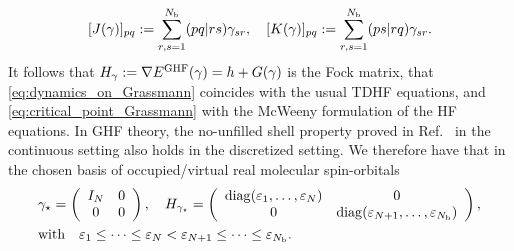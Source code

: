 \documentclass[11pt]{article}
\begin{document}
\begin{equation}
    \label{eqn:HF Coulomb exchange term}
    [J(\gamma)]_{pq}:=\sum_{r,s=1}^{N_{\rm b}}(pq|rs)\gamma_{sr},\quad [K(\gamma)]_{pq}:=\sum_{r,s=1}^{N_{\rm b}}(ps|rq)\gamma_{sr}.
\end{equation}
It follows that $H_\gamma:=\nabla E^{\rm GHF}(\gamma)=h+G(\gamma)$ is the Fock matrix, that \eqref{eq:dynamics_on_Grassmann} coincides with the usual TDHF equations, and \eqref{eq:critical_point_Grassmann} with the McWeeny formulation of the HF equations.
In GHF theory, the no-unfilled shell property proved in Ref.~\cite{BLLS94} in the continuous setting also holds in the discretized setting. We therefore have that in the chosen basis of occupied/virtual real molecular spin-orbitals
\begin{align}
&\gamma_\star = \left( \begin{array}{cc} I_N & 0 \\ 0 & 0 \end{array} \right), \quad H_{\gamma_\star} = \left( \begin{array}{cc} {\rm diag}(\varepsilon_1,\ldots,\varepsilon_N) & 0 \\ 0 &  {\rm diag}(\varepsilon_{N+1},\ldots,\varepsilon_{N_{\rm b}}) \end{array} \right),  \label{eq:Aufbau} \\
& \mbox{with} \quad \varepsilon_1 \le \cdots \le  \varepsilon_N < \varepsilon_{N+1} \le \cdots \le \varepsilon_{N_{\rm b}}. \label{eq:NUS}
\end{align}
\end{document}
